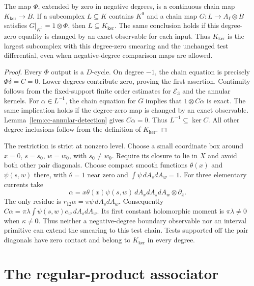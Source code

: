 \begin{theorem}
\label{thm:cc-maximal-domain}
The map $\Phi$, extended by zero in negative degrees, is a continuous
chain map $K_{\mathrm{ker}}\to B$.
If a subcomplex $L\subseteq K$ contains $K^0$ and a chain map
$G:L\to A_I\otimes B$ satisfies $G|_{K^0}=1\otimes\Phi$, then
$L\subseteq K_{\mathrm{ker}}$.
The same conclusion holds if this degree-zero equality is changed by an
exact observable for each input.
Thus $K_{\mathrm{ker}}$ is the largest subcomplex with this degree-zero
smearing and the unchanged test differential, even when negative-degree
comparison maps are allowed.
\end{theorem}
\begin{proof}
Every $\Phi$ output is a $D$-cycle.  On degree $-1$, the chain equation
is precisely $\Phi\delta=C=0$.  Lower degrees contribute zero, proving
the first assertion.  Continuity follows from the fixed-support finite
order estimates for $\mathcal E_3$ and the annular kernels.
For $\alpha\in L^{-1}$, the chain equation for $G$ implies that
$1\otimes C\alpha$ is exact.  The same implication holds if the
degree-zero map is changed by an exact observable.
Lemma~\ref{lem:cc-annular-detection} gives $C\alpha=0$.
Thus $L^{-1}\subseteq\ker C$.  All other degree inclusions follow from
the definition of $K_{\mathrm{ker}}$.
\end{proof}

The restriction is strict at nonzero level.  Choose a small coordinate
box around $x=0$, $s=s_0$, $w=w_0$, with $s_0\ne w_0$.
Require its closure to lie in $X$ and avoid both other pair diagonals.
Choose compact smooth functions $\theta(x)$ and $\psi(s,w)$ there,
with $\theta=1$ near zero and $\int\psi\,dA_s dA_w=1$.
For three elementary currents take
\[
 \alpha=x\theta(x)\psi(s,w)\,dA_xdA_sdA_w
                     \otimes\partial_{\bar x}.
\]
The only residue is $r_{12}\alpha=\pi\psi\,dA_s dA_w$.
Consequently $C\alpha=\pi\lambda\int\psi(s,w)e_w\,dA_sdA_w$.
Its first constant holomorphic moment is $\pi\lambda\ne0$ when
$\kappa\ne0$.  Thus neither a negative-degree boundary observable nor
an interval primitive can extend the smearing to this test chain.
Tests supported off the pair diagonals have zero contact and belong to
$K_{\mathrm{ker}}$ in every degree.

\section{The regular-product associator}

